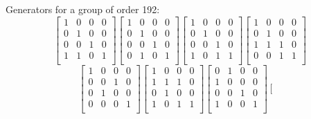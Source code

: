 {\small\arraycolsep=2pt
Generators for a group of order 192:
$$
\left[
\begin{array}{*{4}{r}}
1 & 0 & 0 & 0\\
0 & 1 & 0 & 0\\
0 & 0 & 1 & 0\\
1 & 1 & 0 & 1\\
\end{array}
\right]
\left[
\begin{array}{*{4}{r}}
1 & 0 & 0 & 0\\
0 & 1 & 0 & 0\\
0 & 0 & 1 & 0\\
0 & 1 & 0 & 1\\
\end{array}
\right]
\left[
\begin{array}{*{4}{r}}
1 & 0 & 0 & 0\\
0 & 1 & 0 & 0\\
0 & 0 & 1 & 0\\
1 & 0 & 1 & 1\\
\end{array}
\right]
\left[
\begin{array}{*{4}{r}}
1 & 0 & 0 & 0\\
0 & 1 & 0 & 0\\
1 & 1 & 1 & 0\\
0 & 0 & 1 & 1\\
\end{array}
\right]
$$
$$
\left[
\begin{array}{*{4}{r}}
1 & 0 & 0 & 0\\
0 & 0 & 1 & 0\\
0 & 1 & 0 & 0\\
0 & 0 & 0 & 1\\
\end{array}
\right]
\left[
\begin{array}{*{4}{r}}
1 & 0 & 0 & 0\\
1 & 1 & 1 & 0\\
0 & 1 & 0 & 0\\
1 & 0 & 1 & 1\\
\end{array}
\right]
\left[
\begin{array}{*{4}{r}}
0 & 1 & 0 & 0\\
1 & 0 & 0 & 0\\
0 & 0 & 1 & 0\\
1 & 0 & 0 & 1\\
\end{array}
\right]
\left[
\begin{array}{*{4}{r}}

\end{array}$$}
